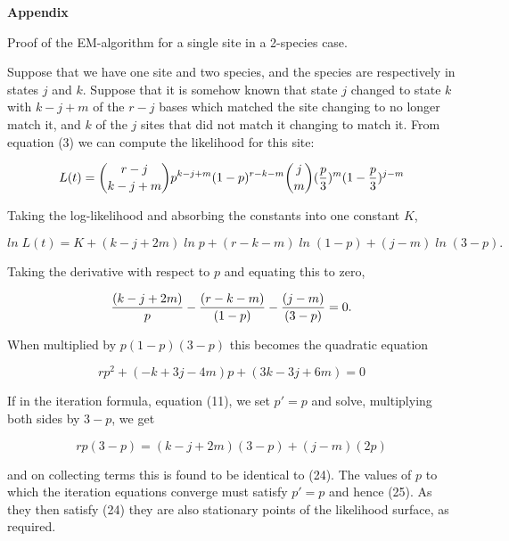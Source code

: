\centerline{\bf Appendix}
\medskip

\centerline{Proof of the EM-algorithm for a single site in a 2-species case.}
\medskip

Suppose that we have one site and two species, and the species are respectively
in states $j$ and $k$.  Suppose that it is somehow known that state $j$
changed to
state $k$ with $k-j+m$ of the $r-j$ bases which matched the site changing to
no longer match it, and $k$ of the $j$ sites that did not match it changing
to match it.  From equation (3) we can compute the likelihood for this site:

\begin{equation} %
L(t)   =    {r-j \choose k-j+m} p^{k-j+m} (1-p)^{r-k-m} {j \choose m} ({p \over 3})^m (1-{p \over 3})^{j-m} 
\end{equation}

Taking the log-likelihood and absorbing the constants into one constant $K$,

\begin{equation} %
ln\;L(t)   =    K + (k-j+2m) \;ln\;p + (r-k-m) \;ln\;(1-p) + (j-m) \;ln\;(3-p).
\end{equation}

Taking the derivative with respect to $p$ and equating this to zero,

\begin{equation} %
{(k-j+2m) \over p} - {(r-k-m) \over (1-p)} - {(j-m) \over (3-p)} = 0.
\end{equation}

When multiplied by $p(1-p)(3-p)$ this becomes the quadratic equation

\begin{equation} %
r p^2 +  (-k + 3j -4m) p + (3k-3j+6m) = 0
\end{equation}

If in the iteration formula, equation (11), we set $p' = p$ and solve,
multiplying both sides by $3-p$, we get

\begin{equation} %
r p (3-p) = (k-j+2m)(3-p) + (j-m)(2p)
\end{equation}

and on collecting terms this is found to be identical to (24).  The
values of $p$ to which the iteration equations converge must satisfy
$p' = p$ and hence (25).  As they then satisfy (24) they are also stationary
points of the likelihood surface, as required.

\newpage


